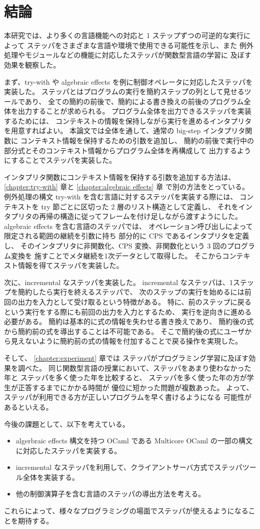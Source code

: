 \chapter{結論}
\label{chapter:conclusion}

本研究では、より多くの言語機能への対応と 1 ステップずつの可逆的な実行によって
ステッパをさまざまな言語や環境で使用できる可能性を示し、また
例外処理やモジュールなどの機能に対応したステッパが関数型言語の学習に
及ぼす効果を観察した。

まず、try-with や algebraic effects を例に制御オペレータに対応したステッパを実装した。
ステッパとはプログラムの実行を簡約ステップの列として見せるツールであり、
全ての簡約の前後で、簡約による書き換えの前後のプログラム全体を出力することが求められる。
プログラム全体を出力できるステッパを実装するためには、
コンテキストの情報を保持しながら実行を進めるインタプリタを用意すればよい。
本論文では全体を通して、通常の big-step インタプリタ関数に
コンテキスト情報を保持するための引数を追加し、
簡約の前後で実行中の部分式とそのコンテキスト情報からプログラム全体を再構成して
出力するようにすることでステッパを実装した。

インタプリタ関数にコンテキスト情報を保持する引数を追加する方法は、
\ref{chapter:try-with} 章と \ref{chapter:algebraic effects} 章
で別の方法をとっている。
例外処理の構文 try-with を含む言語に対するステッパを実装する際には、
コンテキストを try 節ごとに区切った 2 層のリスト構造として定義し、
それをインタプリタの再帰の構造に従ってフレームを付け足しながら渡すようにした。
algebraic effects を含む言語のステッパでは、
オペレーション呼び出しによって限定される範囲の継続を引数に持ち
部分的に CPS であるインタプリタを定義し、
そのインタプリタに非関数化、CPS 変換、非関数化という 3 回のプログラム変換を
施すことでメタ継続を1次データとして取得した。
そこからコンテキスト情報を得てステッパを実装した。

次に、incremental なステッパを実装した。
incremental なステッパは、1ステップを簡約したら実行を終えるステッパで、
次のステップの実行を始めるには前回の出力を入力として受け取るという特徴がある。
特に、前のステップに戻るという実行をする際にも前回の出力を入力とするため、
実行を逆向きに進める必要がある。
簡約は基本的に式の情報を失わせる書き換えであり、
簡約後の式から簡約前の式を導出することは不可能である。
そこで簡約後の式にユーザから見えないように簡約前の式の情報を付加することで戻る操作を実現した。

そして、 \ref{chapter:experiment} 章では
ステッパがプログラミング学習に及ぼす効果を調べた。
同じ関数型言語の授業において、ステッパをあまり使わなかった年と
ステッパを多く使った年を比較すると、
ステッパを多く使った年の方が学生が正答するまでにかかる時間が
優位に短かった問題が複数あった。
よって、ステッパが利用できる方が正しいプログラムを早く書けるようになる
可能性があるといえる。

今後の課題として、以下を考えている。

\begin{itemize}
\item algerbraic effects 構文を持つ OCaml である Multicore OCaml の一部の構文に対応したステッパを実装する。
\item incremental なステッパを利用して、クライアントサーバ方式でステッパツール全体を実装する。
\item 他の制御演算子を含む言語のステッパの導出方法を考える。
\end{itemize}

\noindent これらによって、様々なプログラミングの場面でステッパが使えるようになることを期待する。
